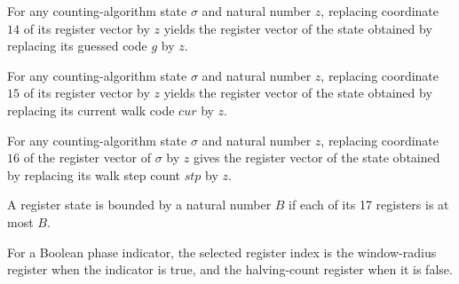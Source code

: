 \begin{lemma}
\label{Complexity.LogProg.ISCount.St.upd_g}
\leanok
{}
For any counting-algorithm state $\sigma$ and natural number $z$, replacing coordinate
$14$ of its register vector by $z$ yields the register vector of the state obtained by
replacing its guessed code $g$ by $z$.
\end{lemma}

\begin{lemma}
\label{Complexity.LogProg.ISCount.St.upd_cur}
\leanok
{}
For any counting-algorithm state $\sigma$ and natural number $z$, replacing coordinate
$15$ of its register vector by $z$ yields the register vector of the state obtained by
replacing its current walk code $cur$ by $z$.
\end{lemma}

\begin{lemma}
\label{Complexity.LogProg.ISCount.St.upd_stp}
\leanok
{}
For any counting-algorithm state $\sigma$ and natural number $z$, replacing coordinate
$16$ of the register vector of $\sigma$ by $z$ gives the register vector of the state
obtained by replacing its walk step count $stp$ by $z$.
\end{lemma}

\begin{definition}
\label{Complexity.LogProg.ISCount.St.Bd}
\leanok
{}
A register state is bounded by a natural number $B$ if each of its 17 registers is at
most $B$.
\end{definition}

\begin{definition}
\label{Complexity.LogProg.ISCount.rY}
\leanok
{}
For a Boolean phase indicator, the selected register index is the window-radius register
when the indicator is true, and the halving-count register when it is false.
\end{definition}

